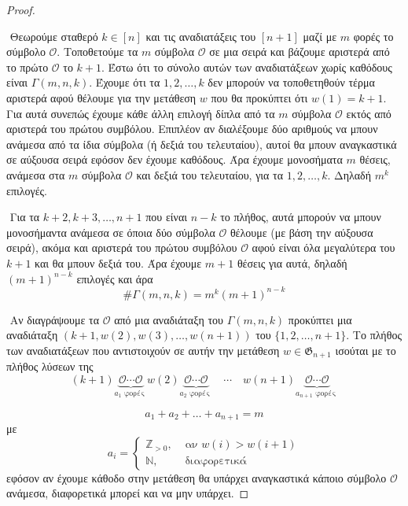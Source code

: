 \documentclass[oneside,a4paper]{article}
\newcommand{\Z}{\mathbb{Z}}
\begin{document}
\vspace*{1cm}
\begin{proof} $ $

	$ $\newline
	Θεωρούμε σταθερό $k \in [n]$ και τις αναδιατάξεις του $[n+1]$ μαζί με $m$ φορές το σύμβολο $\mathcal{O}$. Τοποθετούμε τα $m$ σύμβολα $\mathcal{O}$ σε μια σειρά και βάζουμε αριστερά από το πρώτο $\mathcal{O}$ το $k+1$. Έστω ότι το σύνολο αυτών των αναδιατάξεων χωρίς καθόδους είναι $\Gamma(m,n,k)$. Έχουμε ότι τα $1,2,\ldots,k$ δεν μπορούν να τοποθετηθούν τέρμα αριστερά αφού θέλουμε για την μετάθεση $w$ που θα προκύπτει ότι $w(1)=k+1$. Για αυτά συνεπώς έχουμε κάθε άλλη επιλογή δίπλα από τα $m$ σύμβολα $\mathcal{O}$ εκτός από αριστερά του πρώτου συμβόλου. Επιπλέον αν διαλέξουμε δύο αριθμούς να μπουν ανάμεσα από τα ίδια σύμβολα (ή δεξιά του τελευταίου), αυτοί θα μπουν αναγκαστικά σε αύξουσα σειρά εφόσον δεν έχουμε καθόδους. Άρα έχουμε μονοσήματα $m$ θέσεις, ανάμεσα στα $m$ σύμβολα $\mathcal{O}$ και δεξιά του τελευταίου, για τα $1,2,\ldots,k$. Δηλαδή $m^k$ επιλογές.    

	$ $\newline
	Για τα $k+2,k+3,\ldots,n+1$ που είναι $n-k$ το πλήθος, αυτά μπορούν να μπουν μονοσήμαντα ανάμεσα σε όποια δύο σύμβολα $\mathcal{O}$ θέλουμε (με βάση την αύξουσα σειρά), ακόμα και αριστερά του πρώτου συμβόλου $\mathcal{O}$ αφού είναι όλα μεγαλύτερα του $k+1$ και θα μπουν δεξιά του. Άρα έχουμε $m+1$ θέσεις για αυτά, δηλαδή $(m+1)^{n-k}$ επιλογές και άρα 
	$$\# \Gamma(m,n,k)= m^{k} (m+1)^{n-k}$$

	$ $\newline
	Αν διαγράψουμε τα $\mathcal{O}$ από μια αναδιάταξη του $\Gamma(m,n,k)$ προκύπτει μια αναδιάταξη $(k+1,w(2),w(3),\ldots,w(n+1))$ του $\{1,2,\ldots,n+1\}$. Το πλήθος των αναδιατάξεων που αντιστοιχούν σε αυτήν την μετάθεση $w \in \mathfrak{G}_{n+1}$ ισούται με το πλήθος λύσεων της $$(k+1)\underbrace{\mathcal{O}\cdots\mathcal{O}}_{a_1 \text{ φορές }} w(2) \underbrace{\mathcal{O}\cdots\mathcal{O}}_{a_2 \text{ φορές }} \quad \cdots \quad w(n+1)\underbrace{\mathcal{O}\cdots\mathcal{O}}_{a_{n+1} \text{ φορές }}$$

	$$a_1 + a_2 + \ldots + a_{n+1} = m$$ με $$a_i = \begin{cases}
		\Z_{>0}, & \text{ αν } w(i) > w(i+1) \\
		\mathbb{N}, & \text{ διαφορετικά }
	\end{cases}$$ εφόσον αν έχουμε κάθοδο στην μετάθεση θα υπάρχει αναγκαστικά κάποιο σύμβολο $\mathcal{O}$ ανάμεσα, διαφορετικά μπορεί και να μην υπάρχει.


\end{proof}
\end{document}
